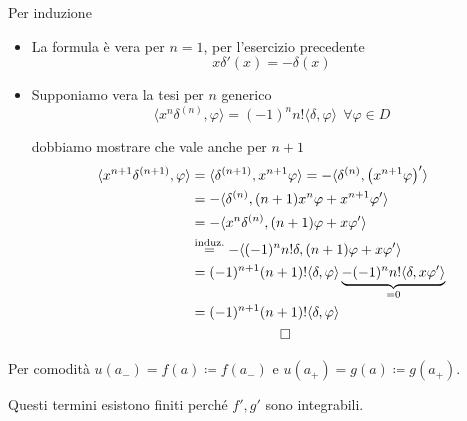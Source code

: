 Per induzione
\begin{itemize}
\item La formula è vera per $n = 1$, per l'esercizio precedente
\begin{equation*}
x\delta '(x) = - \delta (x)
\end{equation*}
\item Supponiamo vera la tesi per $n$ generico
\begin{equation*}
\langle x^{n} \delta^{(n)}, \varphi \rangle = (- 1)^{n} n!\langle \delta, \varphi \rangle \ \ \forall \varphi \in D
\end{equation*}

dobbiamo mostrare che vale anche per $n + 1$
\begin{gather*}
\begin{aligned}
\langle x^{n + 1} \delta^{(n + 1)}, \varphi \rangle & = \langle \delta^{(n + 1)}, x^{n + 1} \varphi \rangle = - \langle \delta^{(n)}, \left(x^{n + 1} \varphi \right) '\rangle \\
 & = - \langle \delta^{(n)}, (n + 1) x^{n} \varphi + x^{n + 1} \varphi '\rangle \\
 & = - \langle x^{n} \delta^{(n)}, (n + 1) \varphi + x\varphi '\rangle \\
 & \overset{\text{induz.}}{=} - \langle (- 1)^{n} n!\delta, (n + 1) \varphi + x\varphi '\rangle \\
 & = (- 1)^{n + 1}(n + 1) !\langle \delta, \varphi \rangle \underbrace{- (- 1)^{n} n!\langle \delta, x\varphi '\rangle}_{= 0}\\
 & = (- 1)^{n + 1}(n + 1) !\langle \delta, \varphi \rangle
\end{aligned}\\
\qed
\end{gather*}
\end{itemize}
\Soluzione

Per comodità $u(a_{-}) = f(a) \coloneqq f(a_{-})$ e $u(a_{+}) = g(a) \coloneqq g(a_{+})$.

Questi termini esistono finiti perché $f', g'$ sono integrabili.

